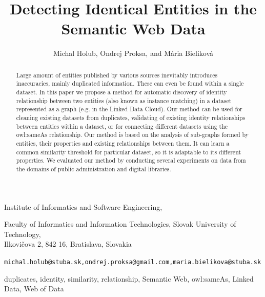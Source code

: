 \documentclass{llncs}
\begin{document}
\title{\bf Detecting Identical Entities in the Semantic Web Data \rm}

\date{}

\author{Michal Holub, Ondrej Proksa, and M\'{a}ria Bielikov\'{a}}

\institute{}

\maketitle

\begin{center}
\footnotesize Institute of Informatics and Software Engineering,

Faculty of Informatics and Information Technologies, Slovak University of Technology,\\

Ilkovi\v{c}ova 2, 842 16, Bratislava, Slovakia

\texttt{michal.holub@stuba.sk,ondrej.proksa@gmail.com,maria.bielikova@stuba.sk}

\end{center}

\begin{abstract}
Large amount of entities published by various sources inevitably
introduces inaccuracies, mainly duplicated information. These
can even be found within a single dataset. In this paper we propose
a method for automatic discovery of identity relationship between two
entities (also known as instance matching) in a dataset represented as
a graph (e.g. in the Linked Data Cloud). Our method can be used for
cleaning existing datasets from duplicates, validating of existing identity
relationships between entities within a dataset, or for connecting different
datasets using the owl:sameAs relationship. Our method is based on the
analysis of sub-graphs formed by entities, their properties and existing
relationships between them. It can learn a common similarity threshold
for particular dataset, so it is adaptable to its different properties.
We evaluated our method by conducting several experiments on data from
the domains of public administration and digital libraries.
\end{abstract}

\begin{keywords}
duplicates, identity, similarity, relationship, Semantic Web,
 owl:sameAs, Linked Data, Web of Data
\end{keywords}
\end{document}
